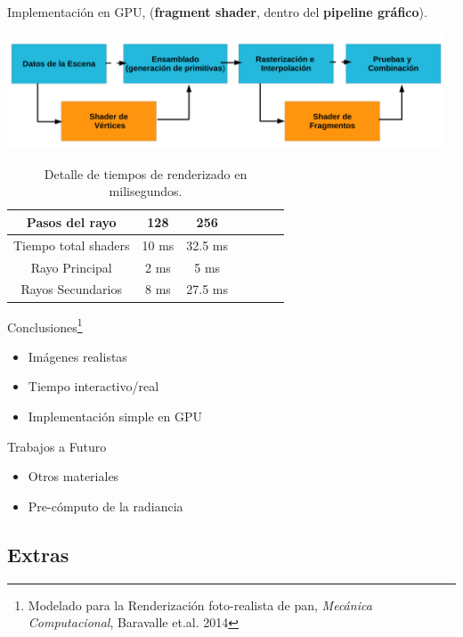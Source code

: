 \documentclass[spanish,unknownkeysallowed,10pt]{beamer}
\begin{document}
\begin{frame}
Implementación en GPU, (\textbf{fragment shader}, dentro del \textbf{pipeline gráfico}).

\centerline{\includegraphics[width=13cm]{../figures/pipelinegrafico}}

\begin{table}[htb]
\centering

\begin{tabular}{|c|c|c|c|c|c|c|}
\hline
 Pasos del rayo         & 128 &  256 \\
\hline
\hline
 Tiempo total shaders   & 10 ms &  32.5 ms \\
\hline
 Rayo Principal         & 2 ms  & 5 ms  \\
\hline
 Rayos Secundarios      &  8 ms & 27.5 ms  \\
\hline
\end{tabular}
\caption{Detalle de tiempos de renderizado en milisegundos.}
\label{tab:n2}
\end{table}


\end{frame}


\begin{frame}{Conclusiones\footnote{Modelado para la Renderización foto-realista de pan, {\it Mecánica Computacional}, Baravalle et.al. 2014}}
\begin{itemize}
\item Imágenes realistas
\item Tiempo interactivo/real
\item Implementación simple en GPU
\end{itemize}

\begin{block}{Trabajos a Futuro}
\begin{itemize}
\item Otros materiales
\item Pre-cómputo de la radiancia
\end{itemize}
\end{block}
\end{frame}

\subsection{Extras}
\end{document}
